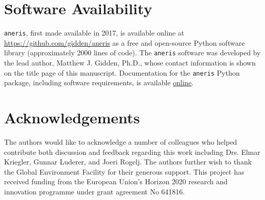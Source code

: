 \documentclass[review]{elsarticle}
\begin{document}
 
\newpage
\section*{Software Availability}

\texttt{aneris}, first made available in 2017, is available online at
\url{https://github.com/gidden/aneris} as a free and open-source Python software
library (approximately 2000 lines of code). The \texttt{aneris} software was
developed by the lead author, Matthew J. Gidden, Ph.D., whose contact
information is shown on the title page of this manuscript. Documentation for the
\texttt{aneris} Python package, including software requirements, is available
\href{http://mattgidden.com/aneris/}{online}.

\newpage




% 
% 
% 


\section*{Acknowledgements}

The authors would like to acknowledge a number of colleagues who helped
contribute both discussion and feedback regarding this work including Drs. Elmar
Kriegler, Gunnar Luderer, and Joeri Rogelj. The authors further wish to thank
the Global Environment Facility for their generous support. This project has
received funding from the European Union’s Horizon 2020 research and innovation
programme under grant agreement No 641816.

\newpage
\section*{\refname}

\end{document}
